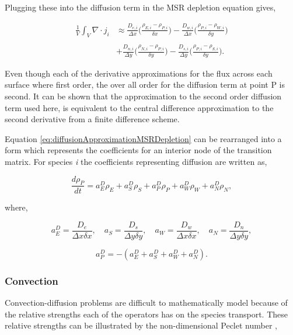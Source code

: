 \noindent Plugging these into the diffusion term in the MSR depletion equation gives,

\begin{equation}
\begin{split}
    \frac{1}{V}\int_{V}\nabla \cdot j_{i} &\approx \frac{D_{e,i}}{\Delta x}\bigg(\frac{\rho_{E,i} - \rho_{P,i}}{\delta x}\bigg) - \frac{D_{w,i}}{\Delta x}\bigg(\frac{\rho_{P,i} - \rho_{W,i}}{\delta y}\bigg) \\ \\
    &+ \frac{D_{n,i}}{\Delta y}\bigg(\frac{\rho_{N,i} - \rho_{P,i}}{\delta y}\bigg) - \frac{D_{s,i}}{\Delta y}\bigg(\frac{\rho_{P,i} - \rho_{S,i}}{\delta y}\bigg).
    \label{eq:diffusionApproximationMSRDepletion}
\end{split}
\end{equation}

\noindent Even though each of the derivative approximations for the flux across each surface where first order, the over all order for the diffusion term at point P is second. It can be shown that the approximation to the second order diffusion term used here, is equivalent to the central difference approximation to the second derivative from a finite difference scheme.

Equation \ref{eq:diffusionApproximationMSRDepletion} can be rearranged into a form which represents the coefficients for an interior node of the transition matrix. For species \textit{i} the coefficients representing diffusion are written as, 

\begin{equation}
    \frac{d \rho_{P}}{dt} = a^{D}_{E}\rho_{E} + a^{D}_{S}\rho_{S} + a^{D}_{P}\rho_{P} + a^{D}_{W}\rho_{W} + a^{D}_{N}\rho_{N},
\end{equation}

\noindent where,

\begin{equation*}
    a^{D}_{E} = \frac{D_{e}}{\Delta x \delta x}, \quad 
    a_{S} = \frac{D_{s}}{\Delta y \delta y}, \quad
    a_{W} = \frac{D_{w}}{\Delta x \delta x}, \quad
    a_{N} = \frac{D_{n}}{\Delta y \delta y},
\end{equation*}

\begin{equation*}
    a^{D}_{P} = - (a^{D}_{E} + a^{D}_{S} + a^{D}_{W} + a^{D}_{N}).
\end{equation*}

\subsubsection{Convection}
Convection-diffusion problems are difficult to mathematically model because of the relative strengths each of the operators has on the species transport. These relative strengths can be illustrated by the non-dimensional Peclet number \cite{versteeg2007},

